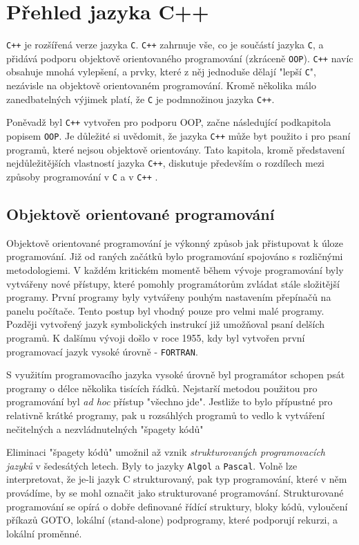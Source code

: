 \chapter{Přehled jazyka C++}
\minitoc
\newpage
  \texttt{C++} je rozšířená verze jazyka \texttt{C}. \texttt{C++} zahrnuje vše, co je součástí jazyka \texttt{C}, a přidává
   podporu objektově orientovaného programování (zkráceně \texttt{OOP}). \texttt{C++} navíc obsahuje mnohá vylepšení, a prvky,
   které z něj jednoduše dělají "lepší \texttt{C}", nezávisle na objektově orientovaném programování. Kromě několika málo
   zanedbatelných výjimek platí, že \texttt{C} je podmnožinou jazyka \texttt{C++}.

   Poněvadž byl \texttt{C++} vytvořen pro podporu OOP, začne následující podkapitola popis\-em \texttt{OOP}. Je důležité si
   uvědomit, že jazyka \texttt{C++} může byt použito i pro psaní programů, které nejsou objektově orientovány. Tato kapitola,
   kromě představení nejdůležitějších vlastností jazyka \texttt{C++}, diskutuje především o rozdílech mezi způsoby programování v
   \texttt{C} a v \texttt{C++} \cite[p.~20]{Schildt}.

\section{Objektově orientované programování}
  Objektově orientované programování je výkonný způsob jak přistupovat k úloze programování. Již od raných začátků bylo
  programování spojováno s rozličnými metodologiemi. V každém kritickém momentě během vývoje programování byly vytvářeny nové
  přístupy, které pomohly programátorům zvládat stále složitější programy. První programy byly vytvářeny pouhým nastavením
  přepínačů na panelu počítače. Tento postup byl vhodný pouze pro velmi malé programy. Později vytvořený jazyk symbolických
  instrukcí již umožňoval psaní delších programů. K dalšímu vývoji došlo v roce 1955, kdy byl vytvořen první programovací jazyk
  vysoké úrovně - \texttt{FORTRAN}.

  S využitím programovacího jazyka vysoké úrovně byl programátor schopen psát programy o délce několika tisících řádků. Nejstarší
  metodou použitou pro programování byl \emph{ad hoc} přístup "všechno jde". Jestliže to bylo přípustné pro relativně krátké
  programy, pak u rozsáhlých programů to vedlo k vytváření nečitelných a nezvládnutelných "špagety kódů"

  Eliminaci "špagety kódů" umožnil až vznik \emph{strukturovaných programovacích jazyků} v šedesátých letech. Byly to jazyky
  \texttt{Algol} a \texttt{Pascal}. Volně lze interpretovat, že je-li jazyk C strukturovaný, pak typ programování, které v něm
  provádíme, by se mohl označit jako strukturované programování. Strukturované programování se opírá o dobře definované řídící
  struktury, bloky kódů, vyloučení příkazů GOTO, lokální (stand-alone) podprogramy, které podporují rekurzi, a lokální proměnné.

